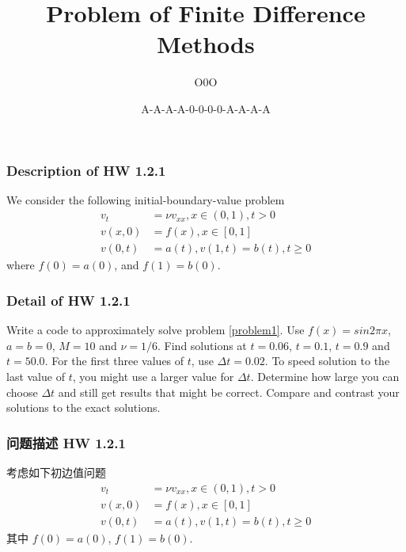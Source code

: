 \documentclass[14pt, hyperref={CJKbookmarks=true}]{beamer}
\begin{document}
\title[FDM]{Problem of Finite Difference Methods}
\author{O0O}
\date[A0A]{A-A-A-A-0-0-0-0-A-A-A-A}

\begin{frame}
\titlepage
\end{frame}

\begin{frame}
    \frametitle{Description of HW 1.2.1}
    We consider the following initial-boundary-value problem
    \begin{subequations}\label{problem1}
        \begin{align} 
            v_{t} & = \nu v_{xx}, x\in(0,1), t>0 \\ 
            v(x,0) & = f(x), x\in[0,1] \\
            v(0,t) & = a(t), v(1,t) = b(t), t\ge0
        \end{align}
    \end{subequations}
    where $f(0) = a(0)$, and $f(1) = b(0)$.
\end{frame}

\begin{frame}
\frametitle{Detail of HW 1.2.1}
Write a code to approximately solve problem \eqref{problem1}.
Use $f(x) = sin2{\pi}x$, $a = b = 0$, $M = 10$ and $\nu = 1/6$.
Find solutions at $t = 0.06$, $t = 0.1$, $t = 0.9$ and $t = 50.0$. 
For the first three values of $t$, use ${\Delta}t = 0.02$. 
To speed solution to the last value of $t$, you might use a larger 
value for ${\Delta}t$. Determine how large you can choose ${\Delta}t$ 
and still get results that might be correct. 
Compare and contrast your solutions to the exact solutions.
\end{frame}

\begin{frame}
\frametitle{问题描述 HW 1.2.1}
考虑如下初边值问题
\begin{align}
v_{t} & = \nu v_{xx}, x\in(0,1), t>0 \\
v(x,0) & = f(x), x\in[0,1] \\
v(0,t) & = a(t), v(1,t) = b(t), t\ge0
\end{align}
其中 $f(0) = a(0)$, $f(1) = b(0)$.
\end{frame}
\end{document}
